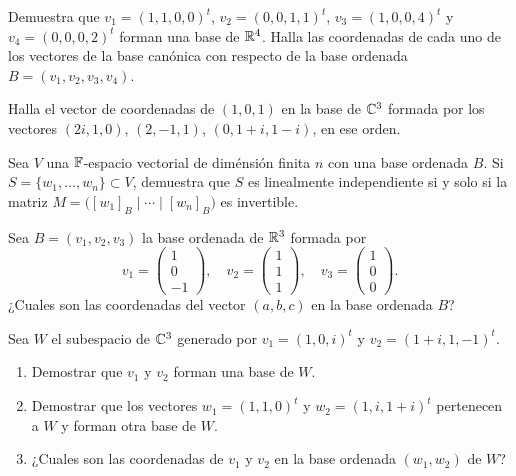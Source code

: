 \ExerciseSection

\begin{exerciselist}
  \item Demuestra que $v_1 = (1, 1, 0, 0)^t$, $v_2 = (0, 0, 1, 1)^t$, $v_3 = (1, 0, 0, 4)^t$ y $v_4 = (0, 0, 0, 2)^t$ forman una base de $\mathbb{R}^4$. Halla las coordenadas de cada uno de los vectores de la base canónica con respecto de la base ordenada $B = (v_1, v_2, v_3, v_4)$.
  
  \item Halla el vector de coordenadas de $(1, 0, 1)$ en la base de $\mathbb{C}^3$ formada por los vectores $(2i, 1, 0)$, $(2, -1, 1)$, $(0, 1+i, 1-i)$, en ese orden.
  
  \item Sea $V$ una $\mathbb{F}$-espacio vectorial de diménsión finita $n$ con una base ordenada $B$. Si $S = \{w_1, \ldots, w_n\} \subset V$, demuestra que $S$ es linealmente independiente si y solo si la matriz $M = \bigl( [w_1]_B \mid \cdots \mid [w_n]_B\bigr)$ es invertible.
  
  \item Sea $B = (v_1, v_2, v_3)$ la base ordenada de $\mathbb{R}^3$ formada por
    \[ 
      v_1 = \begin{pmatrix} 1 \\ 0 \\ -1 \end{pmatrix}, \quad
      v_2 = \begin{pmatrix} 1 \\ 1 \\ 1 \end{pmatrix}, \quad
      v_3 = \begin{pmatrix} 1 \\ 0 \\ 0 \end{pmatrix}.
    \]
    ¿Cuales son las coordenadas del vector $(a,b,c)$ en la base ordenada $B$?

  \item Sea $W$ el subespacio de $\mathbb{C}^3$ generado por $v_1 = (1, 0, i)^t$ y $v_2 = (1+i, 1, -1)^t$.
    \begin{enumerate}
      \item Demostrar que $v_1$ y $v_2$ forman una base de $W$.
      \item Demostrar que los vectores $w_1 = (1, 1, 0)^t$ y $w_2 = (1, i, 1+i)^t$ pertenecen a $W$ y forman otra base de $W$.
      \item ¿Cuales son las coordenadas de $v_1$ y $v_2$ en la base ordenada $(w_1, w_2)$ de $W$?
    \end{enumerate}
  

\end{exerciselist}
